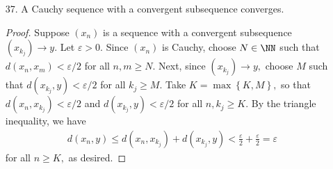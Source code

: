 \documentclass{article}
\begin{document}
\begin{itemize}
\begin{proof}
			Take two points $x, y\in A\cup B.$ If $x$ and $y$ are both in $A,$ then $d(x, y)\le \diam (A),$ so
			\begin{align*}
				\diam(A\cup B) = \sup\left\{ d(a, b):a, b\in A\cup B \right\} \le \diam (A)
			\end{align*}
			and similarly if $x, y\in B.$ WLOG $x\in A, y\in B.$ Since $A\cap B\neq\varnothing,$ take $z\in A\cap B\implies z\in A, z\in B.$
			\begin{align*}
				d(x, y) &\le d(x, z) + d(y, z) \le \diam(A)+\diam(B) \\
				\implies \diam(A\cup B)&=\sup\left\{ d(a, b):a, b\in A\cup B \right\}\le \diam(A)+\diam(B)
			\end{align*}
			as desired.
		\end{proof}

	\item[37.] A Cauchy sequence with a convergent subsequence converges.
		\begin{proof}
			Suppose $(x_n)$ is a sequence with a convergent subsequence $(x_{k_j})\to y.$ Let $\varepsilon>0.$ Since $(x_n)$ is Cauchy, choose $N\in \NN$ such that $d(x_n, x_m)<\varepsilon/2$ for all $n, m\ge N.$ Next, since $(x_{k_j})\to y,$ choose $M$ such that $d(x_{k_j}, y)<\varepsilon/2$ for all $k_j\ge M.$ Take $K=\max\left\{ K, M \right\},$ so that $d(x_n, x_{k_j})<\varepsilon/2$ and $d(x_{k_j}, y)<\varepsilon/2$ for all $n, k_j\ge K.$ By the triangle inequality, we have
			\begin{align*}
				d(x_n, y)\le d(x_n, x_{k_j}) + d(x_{k_j}, y)<\frac{\varepsilon}{2} + \frac{\varepsilon}{2} = \varepsilon
			\end{align*}
			for all $n\ge K,$ as desired.
		\end{proof}
		
\end{itemize}
\end{document}

